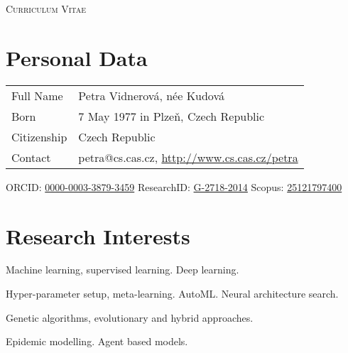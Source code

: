 \documentclass[a4paper, oneside, final]{scrartcl} %
\begin{document}


\noindent
{\fontsize{18}{18}\selectfont\scshape Curriculum Vitae} 



\section{Personal Data}
\begin{tabularx}{0.97\linewidth}{>{\raggedright}p{2cm}X}
Full Name & 	Petra Vidnerov\'a, n\'ee Kudov\'a\\
Born & 7 May 1977 in Plze\v{n}, Czech Republic\\
Citizenship 	& Czech Republic\\
Contact & petra@cs.cas.cz, \href{http://www.cs.cas.cz/petra}{http://www.cs.cas.cz/petra}\\
\end{tabularx}

\centerline{}
\centerline{
  ORCID: \href{https://orcid.org/0000-0003-3879-3459}{0000-0003-3879-3459}
  ResearchID: \href{https://www.webofscience.com/wos/author/record/G-2718-2014}{G-2718-2014}
  Scopus: \href{https://www.scopus.com/authid/detail.url?authorId=25121797400}{25121797400}
  \hfill}



\section{Research Interests}

Machine learning, supervised learning. Deep learning.

\noindent
Hyper-parameter setup, meta-learning. AutoML. Neural architecture search.

\noindent
Genetic algorithms, evolutionary and hybrid approaches.

\noindent
Epidemic modelling. Agent based models.

\end{document}
